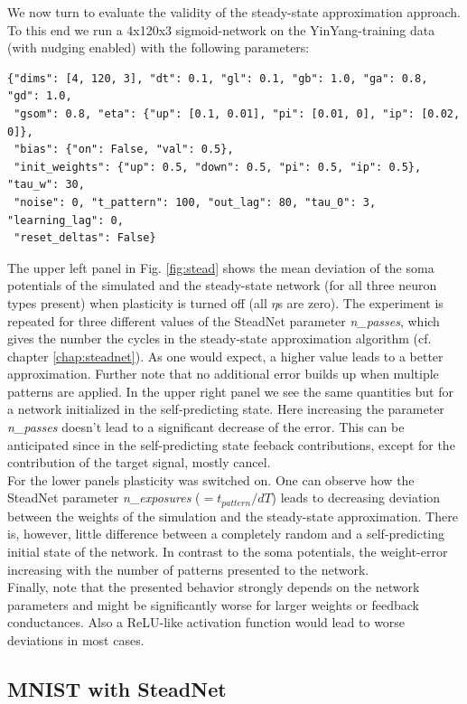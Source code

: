 \documentclass[12pt,a4paper]{article}
\begin{document}
We now turn to evaluate the validity of the steady-state approximation approach. To this end we run a 4x120x3 sigmoid-network on the YinYang-training data (with nudging enabled) with the following parameters:
\begin{verbatim}
{"dims": [4, 120, 3], "dt": 0.1, "gl": 0.1, "gb": 1.0, "ga": 0.8, "gd": 1.0,
 "gsom": 0.8, "eta": {"up": [0.1, 0.01], "pi": [0.01, 0], "ip": [0.02, 0]},
 "bias": {"on": False, "val": 0.5},
 "init_weights": {"up": 0.5, "down": 0.5, "pi": 0.5, "ip": 0.5}, "tau_w": 30,
 "noise": 0, "t_pattern": 100, "out_lag": 80, "tau_0": 3, "learning_lag": 0,
 "reset_deltas": False}
\end{verbatim}
The upper left panel in Fig. \ref{fig:stead} shows the mean deviation of the soma potentials of the simulated and the steady-state network (for all three neuron types present) when plasticity is turned off (all $\eta$s are zero). The experiment is repeated for three different values of the SteadNet parameter \textit{n\_passes}, which gives the number the cycles in the steady-state approximation algorithm (cf. chapter \ref{chap:steadnet}). As one would expect, a higher value leads to a better approximation. Further note that no additional error builds up when multiple patterns are applied. In the upper right panel we see the same quantities but for a network initialized in the self-predicting state. Here increasing the parameter \textit{n\_passes} doesn't lead to a significant decrease of the error. This can be anticipated since in the self-predicting state feeback contributions, except for the contribution of the target signal, mostly cancel.\\
For the lower panels plasticity was switched on. One can observe how the SteadNet parameter \textit{n\_exposures} ($=t_{pattern}/dT$) leads to decreasing deviation between the weights of the simulation and the steady-state approximation. There is, however, little difference between a completely random and a self-predicting initial state of the network. In contrast to the soma potentials, the weight-error increasing with the number of patterns presented to the network.\\
Finally, note that the presented behavior strongly depends on the network parameters and might be significantly worse for larger weights or feedback conductances. Also a ReLU-like activation function would lead to worse deviations in most cases.


\subsection{MNIST with SteadNet}
\end{document}

